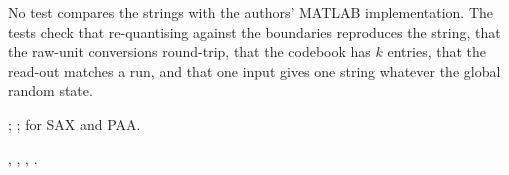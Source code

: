 No test compares the strings with the authors' MATLAB implementation. The tests check that
re-quantising  against the boundaries reproduces the string, that the
raw-unit conversions round-trip, that the codebook has $k$ entries, that the read-out matches
a run, and that one input gives one string whatever the global random state.

\citet{bountrogiannis2021datadriven}; \citet{bountrogiannis2022distribution};
\citet{lin2003symbolic} for SAX and PAA.

, ,
, .
